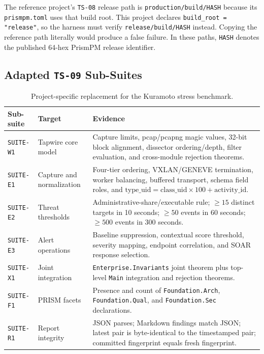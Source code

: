 \documentclass[11pt]{article}
\begin{document}
The reference project's \texttt{TS-08} release path is \texttt{production/build/HASH}
because its \texttt{prismpm.toml} uses that build root. This project declares
\texttt{build\_root = "release"}, so the harness must verify
\texttt{release/build/HASH} instead. Copying the reference path literally
would produce a false failure. In these paths, \texttt{HASH} denotes the published 64-hex
PrismPM release identifier.

\subsection{Adapted \texttt{TS-09} Sub-Suites}

\begin{table}[htbp]
\centering
\small
\begin{tabularx}{\textwidth}{p{2.0cm} p{4.2cm} X}
\toprule
\textbf{Sub-suite} & \textbf{Target} & \textbf{Evidence} \\
\midrule
\texttt{SUITE-W1}
  & Tapwire core model
  & Capture limits, pcap/pcapng magic values, 32-bit block alignment, dissector ordering/depth,
    filter evaluation, and cross-module rejection theorems. \\
\texttt{SUITE-E1}
  & Capture and normalization
  & Four-tier ordering, VXLAN/GENEVE termination, worker balancing, buffered transport, schema field
    roles, and $\mathrm{type\_uid} = \mathrm{class\_uid}\times 100 + \mathrm{activity\_id}$. \\
\texttt{SUITE-E2}
  & Threat thresholds
  & Administrative-share/executable rule; $\geq 15$ distinct targets in 10 seconds; $\geq 50$ events
    in 60 seconds; $\geq 500$ events in 300 seconds. \\
\texttt{SUITE-E3}
  & Alert operations
  & Baseline suppression, contextual score threshold, severity mapping, endpoint correlation, and
    SOAR response selection. \\
\texttt{SUITE-X1}
  & Joint integration
  & \texttt{Enterprise.Invariants} joint theorem plus top-level \texttt{Main} integration and
    rejection theorems. \\
\texttt{SUITE-F1}
  & PRISM facets
  & Presence and count of \texttt{Foundation.Arch}, \texttt{Foundation.Qual}, and
    \texttt{Foundation.Sec} declarations. \\
\texttt{SUITE-R1}
  & Report integrity
  & JSON parses; Markdown findings match JSON; latest pair is byte-identical to the timestamped
    pair; committed fingerprint equals fresh fingerprint. \\
\bottomrule
\end{tabularx}
\caption{Project-specific replacement for the Kuramoto stress benchmark.}
\end{table}
\end{document}
